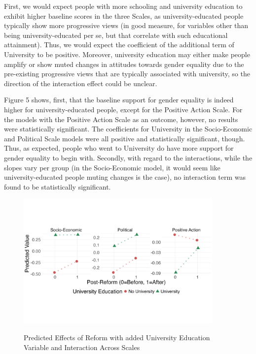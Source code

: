\documentclass[12pt,letterpaper]{article}
\begin{document}
\begin{enumerate}
	\noindent First, we would expect people with more schooling and university education to exhibit higher baseline scores in the three Scales, as university-educated people typically show more progressive views (in good measure, for variables other than being university-educated per se, but that correlate with such educational attainment). Thus, we would expect the coefficient of the additional term of University to be positive. Moreover, university education may either make people amplify or show muted changes in attitudes towards gender equality due to the pre-existing progressive views that are typically associated with university, so the direction of the interaction effect could be unclear. 
	
	\noindent Figure 5 shows, first, that the baseline support for gender equality is indeed higher for university-educated people, except for the Positive Action Scale. For the models with the Positive Action Scale as an outcome, however, no results were statistically significant. The coefficients for University in the Socio-Economic and Political Scale models were all positive and statistically significant, though. Thus, as expected, people who went to University do have more support for gender equality to begin with. Secondly, with regard to the interactions, while the slopes vary per group (in the Socio-Economic model, it would seem like university-educated people muting changes is the case), no interaction term was found to be statistically significant. 
	
	\begin{figure}[H]
		\centering
		\caption{Predicted Effects of Reform with added University Education Variable and Interaction Across Scales}
		\vspace{-1cm}
		\includegraphics[width=0.9\textwidth]{univ_plot}
		\label{fig:univ_plot}
	\end{figure}
	

\end{enumerate}
\end{document}
